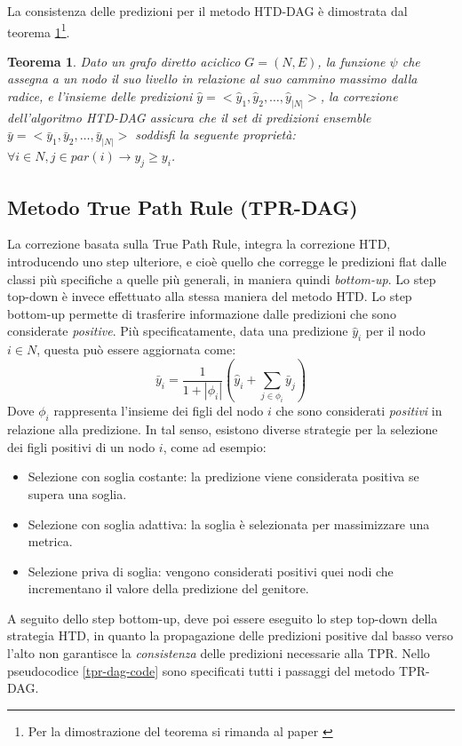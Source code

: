\documentclass[12pt]{report}
\newtheorem{theo}{Teorema}
\begin{document}
La consistenza delle predizioni per il metodo HTD-DAG è dimostrata dal teorema \ref{theo1}\footnote{\footnotesize{Per la dimostrazione del teorema si rimanda al paper \cite{notaro1}}}.
\begin{theo}
Dato un grafo diretto aciclico $G = (N, E)$, la funzione $\psi$ che assegna a un nodo il suo livello in relazione al suo cammino massimo dalla radice, e l'insieme delle predizioni  $\hat{y} = <\hat{y}_1, \hat{y}_2, \dots, \hat{y}_{|N|}>$, la correzione dell'algoritmo HTD-DAG assicura che il set di predizioni ensemble $\bar{y} = <\bar{y}_1, \bar{y}_2, \dots, \bar{y}_{|N|}>$ soddisfi la seguente proprietà: $\forall i \in N, j \in par(i) \rightarrow y_j \geq y_i$.
\label{theo1}
\end{theo}
\subsection{Metodo True Path Rule (TPR-DAG)}
La correzione basata sulla True Path Rule\cite{notaro1}, integra la correzione HTD, introducendo uno step ulteriore, e cioè quello che corregge le predizioni flat dalle classi più specifiche a quelle più generali, in maniera quindi \emph{bottom-up}. Lo step top-down è invece effettuato alla stessa maniera del metodo HTD. 
\newline
\newline
Lo step bottom-up permette di trasferire informazione dalle predizioni che sono considerate \emph{positive}. Più specificatamente, data una predizione $\hat{y}_{i}$ per il nodo $i \in N$, questa può essere aggiornata come:
\[
\bar{y}_i = \frac{1}{1 + |\phi_i|} (\hat{y}_i + \sum_{j \in \phi_i} \bar{y}_j)
\]
Dove $\phi_i$ rappresenta l'insieme dei figli del nodo $i$ che sono considerati \emph{positivi} in relazione alla predizione.
In tal senso, esistono diverse strategie per la selezione dei figli positivi di un nodo $i$, come ad esempio:
\begin{itemize}
\item Selezione con soglia costante: la predizione viene considerata positiva se supera una soglia.
\item Selezione con soglia adattiva: la soglia è selezionata per massimizzare una metrica. 
\item Selezione priva di soglia: vengono considerati positivi quei nodi che incrementano il valore della predizione del genitore.
\end{itemize}
A seguito dello step bottom-up, deve poi essere eseguito lo step top-down della strategia HTD, in quanto la propagazione delle predizioni positive dal basso verso l'alto non garantisce la \emph{consistenza} delle predizioni necessarie alla TPR. Nello pseudocodice \ref{tpr-dag-code} sono specificati tutti i passaggi del metodo TPR-DAG.
\end{document}
